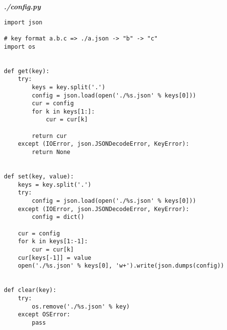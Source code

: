 \textit{\textbf{./config.py}}
\begin{verbatim}
import json

# key format a.b.c => ./a.json -> "b" -> "c"
import os


def get(key):
    try:
        keys = key.split('.')
        config = json.load(open('./%s.json' % keys[0]))
        cur = config
        for k in keys[1:]:
            cur = cur[k]

        return cur
    except (IOError, json.JSONDecodeError, KeyError):
        return None


def set(key, value):
    keys = key.split('.')
    try:
        config = json.load(open('./%s.json' % keys[0]))
    except (IOError, json.JSONDecodeError, KeyError):
        config = dict()

    cur = config
    for k in keys[1:-1]:
        cur = cur[k]
    cur[keys[-1]] = value
    open('./%s.json' % keys[0], 'w+').write(json.dumps(config))


def clear(key):
    try:
        os.remove('./%s.json' % key)
    except OSError:
        pass
\end{verbatim}

